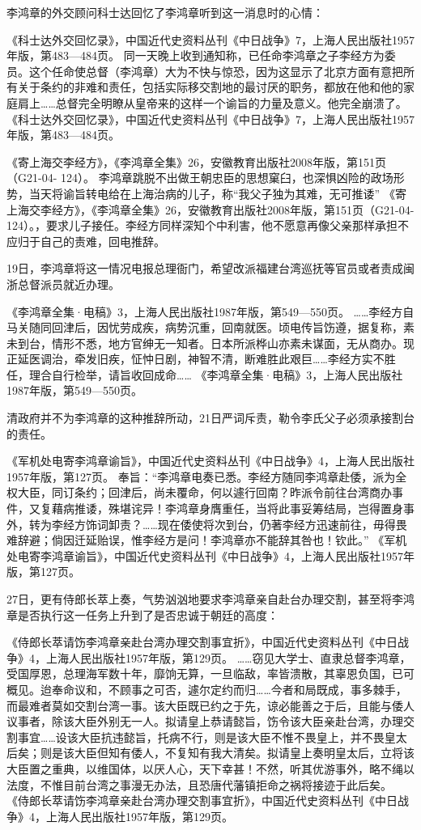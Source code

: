 \documentclass[12pt,UTF8]{ctexbook}
\begin{document}
李鸿章的外交顾问科士达回忆了李鸿章听到这一消息时的心情：

《科士达外交回忆录》，中国近代史资料丛刊《中日战争》7，上海人民出版社1957年版，第483—484页。
同一天晚上收到通知称，已任命李鸿章之子李经方为委员。这个任命使总督（李鸿章）大为不快与惊恐，因为这显示了北京方面有意把所有关于条约的非难和责任，包括实际移交割地的最讨厌的职务，都放在他和他的家庭肩上……总督完全明瞭从皇帝来的这样一个谕旨的力量及意义。他完全崩溃了。 《科士达外交回忆录》，中国近代史资料丛刊《中日战争》7，上海人民出版社1957年版，第483—484页。

《寄上海交李经方》，《李鸿章全集》26，安徽教育出版社2008年版，第151页（G21-04- 124）。
李鸿章跳脱不出做王朝忠臣的思想窠臼，也深惧凶险的政场形势，当天将谕旨转电给在上海治病的儿子，称“我父子独为其难，无可推诿” 《寄上海交李经方》，《李鸿章全集》26，安徽教育出版社2008年版，第151页（G21-04- 124）。，要求儿子接任。李经方同样深知个中利害，他不愿意再像父亲那样承担不应归于自己的责难，回电推辞。

19日，李鸿章将这一情况电报总理衙门，希望改派福建台湾巡抚等官员或者责成闽浙总督派员就近办理。

《李鸿章全集·电稿》3，上海人民出版社1987年版，第549—550页。
……李经方自马关随同回津后，因忧劳成疾，病势沉重，回南就医。顷电传旨饬遵，据复称，素未到台，情形不悉，地方官绅无一知者。日本所派桦山亦素未谋面，无从商办。现正延医调治，牵发旧疾，怔忡日剧，神智不清，断难胜此艰巨……李经方实不胜任，理合自行检举，请旨收回成命…… 《李鸿章全集·电稿》3，上海人民出版社1987年版，第549—550页。

清政府并不为李鸿章的这种推辞所动，21日严词斥责，勒令李氏父子必须承接割台的责任。

《军机处电寄李鸿章谕旨》，中国近代史资料丛刊《中日战争》4，上海人民出版社1957年版，第127页。
奉旨：“李鸿章电奏已悉。李经方随同李鸿章赴倭，派为全权大臣，同订条约；回津后，尚未覆命，何以遽行回南？昨派令前往台湾商办事件，又复藉病推诿，殊堪诧异！李鸿章身膺重任，当将此事妥筹结局，岂得置身事外，转为李经方饰词卸责？……现在倭使将次到台，仍著李经方迅速前往，毋得畏难辞避；倘因迁延贻误，惟李经方是问！李鸿章亦不能辞其咎也！钦此。” 《军机处电寄李鸿章谕旨》，中国近代史资料丛刊《中日战争》4，上海人民出版社1957年版，第127页。

27日，更有侍郎长萃上奏，气势汹汹地要求李鸿章亲自赴台办理交割，甚至将李鸿章是否执行这一任务上升到了是否忠诚于朝廷的高度：

《侍郎长萃请饬李鸿章亲赴台湾办理交割事宜折》，中国近代史资料丛刊《中日战争》4，上海人民出版社1957年版，第129页。
……窃见大学士、直隶总督李鸿章，受国厚恩，总理海军数十年，靡饷无算，一旦临敌，率皆溃散，其辜恩负国，已可概见。迨奉命议和，不顾事之可否，遽尔定约而归……今者和局既成，事多棘手，而最难者莫如交割台湾一事。该大臣既已约之于先，谅必能善之于后，且能与倭人议事者，除该大臣外别无一人。拟请皇上恭请懿旨，饬令该大臣亲赴台湾，办理交割事宜……设该大臣抗违懿旨，托病不行，则是该大臣不惟不畏皇上，并不畏皇太后矣；则是该大臣但知有倭人，不复知有我大清矣。拟请皇上奏明皇太后，立将该大臣置之重典，以维国体，以厌人心，天下幸甚！不然，听其优游事外，略不绳以法度，不惟目前台湾之事漫无办法，且恐唐代藩镇拒命之祸将接迹于此后矣。 《侍郎长萃请饬李鸿章亲赴台湾办理交割事宜折》，中国近代史资料丛刊《中日战争》4，上海人民出版社1957年版，第129页。
\end{document}
